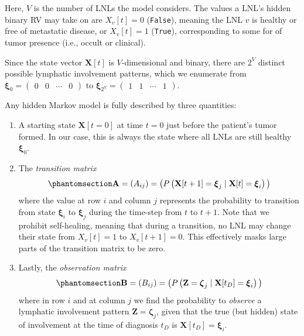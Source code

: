 \documentclass[
  sn-mathphys-num,
]{sn-jnl}
\providecommand{\tightlist}{%
  \setlength{\itemsep}{0pt}\setlength{\parskip}{0pt}}\usepackage{longtable,booktabs,array}
\begin{document}
Here, \(V\) is the number of LNLs the model considers. The values a
LNL's hidden binary RV may take on are \(X_v[t] = 0\) (\texttt{False}),
meaning the LNL \(v\) is healthy or free of metastatic disease, or
\(X_v[t] = 1\) (\texttt{True}), corresponding to some for of tumor
presence (i.e., occult or clinical).

Since the state vector \(\mathbf{X}[t]\) is \(V\)-dimensional and
binary, there are \(2^V\) distinct possible lymphatic involvement
patterns, which we enumerate from
\(\boldsymbol{\xi}_0 = \begin{pmatrix} 0 & 0 & \cdots & 0 \end{pmatrix}\)
to
\(\boldsymbol{\xi}_{2^V} = \begin{pmatrix} 1 & 1 & \cdots & 1 \end{pmatrix}\).

Any hidden Markov model is fully described by three quantities:

\begin{enumerate}
\def\labelenumi{\arabic{enumi}.}
\tightlist
\item
  A starting state \(\mathbf{X}[t=0]\) at time \(t=0\) just before the
  patient's tumor formed. In our case, this is always the state where
  all LNLs are still healthy \(\boldsymbol{\xi}_0\).
\item
  The \emph{transition matrix}
  \begin{equation}\phantomsection\label{eq-trans-matrix}{
  \mathbf{A} = \left( A_{ij} \right) = \big( P \left( \mathbf{X}[t+1] = \boldsymbol{\xi}_j \mid \mathbf{X}[t] = \boldsymbol{\xi}_i \right) \big)
  }\end{equation} where the value at row \(i\) and column \(j\)
  represents the probability to transition from state
  \(\boldsymbol{\xi}_i\) to \(\boldsymbol{\xi}_j\) during the time-step
  from \(t\) to \(t+1\). Note that we prohibit self-healing, meaning
  that during a transition, no LNL may change their state from
  \(X_v[t]=1\) to \(X_v[t+1]=0\). This effectively masks large parts of
  the transition matrix to be zero.
\item
  Lastly, the \emph{observation matrix}
  \begin{equation}\phantomsection\label{eq-obs-matrix}{
  \mathbf{B} = \left( B_{ij} \right) = \big( P \left( \mathbf{Z} = \boldsymbol{\zeta}_j \mid \mathbf{X}[t_D] = \boldsymbol{\xi}_i \right) \big)
  }\end{equation} where in row \(i\) and at column \(j\) we find the
  probability to \emph{observe} a lymphatic involvement pattern
  \(\mathbf{Z} = \boldsymbol{\zeta}_j\), given that the true (but
  hidden) state of involvement at the time of diagnosis \(t_D\) is
  \(\mathbf{X}[t_D] = \boldsymbol{\xi}_i\).
\end{enumerate}
\end{document}
